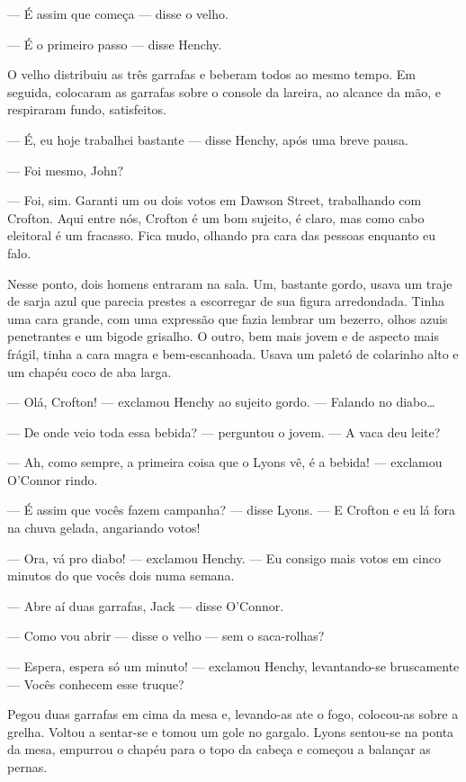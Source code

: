 --- É assim que começa --- disse o velho.

--- É o primeiro passo --- disse Henchy.

O velho distribuiu as três garrafas e beberam todos ao mesmo tempo. Em
seguida, colocaram as garrafas sobre o console da lareira, ao alcance
da mão, e respiraram fundo, satisfeitos.

--- É, eu hoje trabalhei bastante --- disse Henchy, após uma breve
pausa.

--- Foi mesmo, John?

--- Foi, sim. Garanti um ou dois votos em Dawson Street, trabalhando
com Crofton. Aqui entre nós, Crofton é um bom sujeito, 
é claro, mas como cabo eleitoral é um fracasso. Fica mudo, olhando
pra cara das pessoas enquanto eu falo.

Nesse ponto, dois homens entraram na sala. Um, bastante gordo, usava
um traje de sarja azul que parecia prestes a escorregar de sua
figura arredondada. Tinha uma cara grande, com uma expressão que fazia
lembrar um bezerro, olhos azuis penetrantes e um bigode grisalho. O
outro, bem mais jovem e de aspecto mais frágil, tinha a cara magra e
bem-escanhoada. Usava um paletó de colarinho alto e um chapéu coco de
aba larga.

--- Olá, Crofton! --- exclamou Henchy ao sujeito gordo. --- Falando
no diabo\ldots{}

--- De onde veio toda essa bebida? --- perguntou o jovem. --- A vaca
deu leite?

--- Ah, como sempre, a primeira coisa que o Lyons vê, é a bebida! ---
exclamou O'Connor rindo.

--- É assim que vocês fazem campanha? --- disse Lyons. --- E Crofton e
eu lá fora na chuva gelada, angariando votos!

--- Ora, vá pro diabo! --- exclamou Henchy. --- Eu consigo mais votos
em cinco minutos do que vocês dois numa semana.

--- Abre aí duas garrafas, Jack --- disse O'Connor.

--- Como vou abrir --- disse o velho --- sem o saca-rolhas?

--- Espera, espera só um minuto! --- exclamou Henchy, levantando-se
bruscamente --- Vocês conhecem esse truque?

Pegou duas garrafas em cima da mesa e, levando-as ate o fogo,
colocou-as sobre a grelha. Voltou a sentar-se e tomou um gole no
gargalo. Lyons sentou-se na ponta da mesa, empurrou o chapéu para o
topo da cabeça e começou a balançar as pernas.

